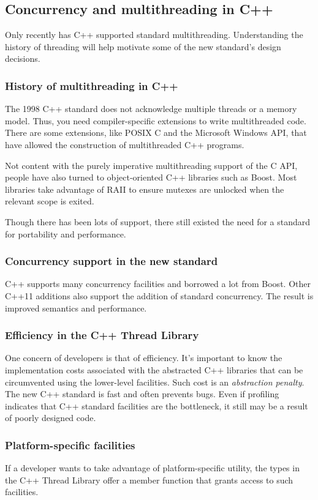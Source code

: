 \subsection{Concurrency and multithreading in C++}
Only recently has C++ supported standard multithreading. Understanding the history of threading will help motivate some of the new standard's design decisions.

\subsubsection{History of multithreading in C++}
The 1998 C++ standard does not acknowledge multiple threads or a memory model. Thus, you need compiler-specific extensions to write multithreaded code. There are some extensions, like POSIX C and the Microsoft Windows API, that have allowed the construction of multithreaded C++ programs.

Not content with the purely imperative multithreading support of the C API, people have also turned to object-oriented C++ libraries such as Boost. Most libraries take advantage of RAII to ensure mutexes are unlocked when the relevant scope is exited.

Though there has been lots of support, there still existed the need for a standard for portability and performance.

\subsubsection{Concurrency support in the new standard}
C++ supports many concurrency facilities and borrowed a lot from Boost. Other C++11 additions also support the addition of standard concurrency. The result is improved semantics and performance.

\subsubsection{Efficiency in the C++ Thread Library}
One concern of developers is that of efficiency. It's important to know the implementation costs associated with the abstracted C++ libraries that can be circumvented using the lower-level facilities. Such cost is an \emph{abstraction penalty}. The new C++ standard is fast and often prevents bugs. Even if profiling indicates that C++ standard facilities are the bottleneck, it still may be a result of poorly designed code.

\subsubsection{Platform-specific facilities}
If a developer wants to take advantage of platform-specific utility, the types in the C++ Thread Library offer a  member function that grants access to such facilities.

